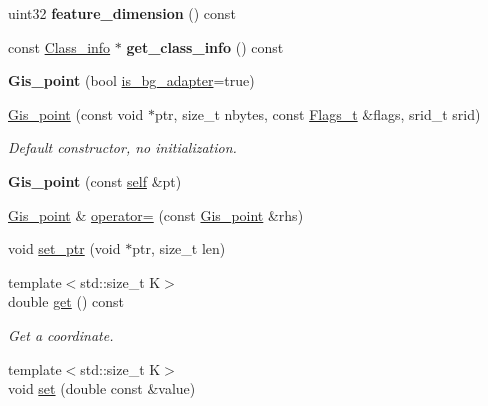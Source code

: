 \begin{DoxyCompactItemize}
uint32 {\bfseries feature\+\_\+dimension} () const
\item 
\mbox{\label{classGis__point_a137364b77834f0e375b505100fa5a9c5}} 
const \mbox{\hyperlink{classGeometry_1_1Class__info}{Class\+\_\+info}} $\ast$ {\bfseries get\+\_\+class\+\_\+info} () const
\item 
\mbox{\label{classGis__point_a2343c7d47b0a528022e788bc6784f6ad}} 
{\bfseries Gis\+\_\+point} (bool \mbox{\hyperlink{classGeometry_ada614004627a9e7af129e51a34242af9}{is\+\_\+bg\+\_\+adapter}}=true)
\item 
\mbox{\label{classGis__point_a2f4b05b90674da73bf19ba056d4af894}} 
\mbox{\hyperlink{classGis__point_a2f4b05b90674da73bf19ba056d4af894}{Gis\+\_\+point}} (const void $\ast$ptr, size\+\_\+t nbytes, const \mbox{\hyperlink{classGeometry_1_1Flags__t}{Flags\+\_\+t}} \&flags, srid\+\_\+t srid)
\begin{DoxyCompactList}\small\item\em Default constructor, no initialization. \end{DoxyCompactList}\item 
\mbox{\label{classGis__point_aac3a957b0d48776210befcb2e13edf74}} 
{\bfseries Gis\+\_\+point} (const \mbox{\hyperlink{classGis__point}{self}} \&pt)
\item 
\mbox{\hyperlink{classGis__point}{Gis\+\_\+point}} \& \mbox{\hyperlink{classGis__point_a2b94bce44d9e070a8d4795d8c0a3654d}{operator=}} (const \mbox{\hyperlink{classGis__point}{Gis\+\_\+point}} \&rhs)
\item 
void \mbox{\hyperlink{classGis__point_ace10c7ba2a76d04093877818d0a08728}{set\+\_\+ptr}} (void $\ast$ptr, size\+\_\+t len)
\item 
{\footnotesize template$<$std\+::size\+\_\+t K$>$ }\\double \mbox{\hyperlink{classGis__point_aa7ec388d5e99b76956e5b50b4ba3a500}{get}} () const
\begin{DoxyCompactList}\small\item\em Get a coordinate. \end{DoxyCompactList}\item 
{\footnotesize template$<$std\+::size\+\_\+t K$>$ }\\void \mbox{\hyperlink{classGis__point_af22de0c9afb8fe99da0cfb70ecdfe64a}{set}} (double const \&value)

\end{DoxyCompactItemize}
